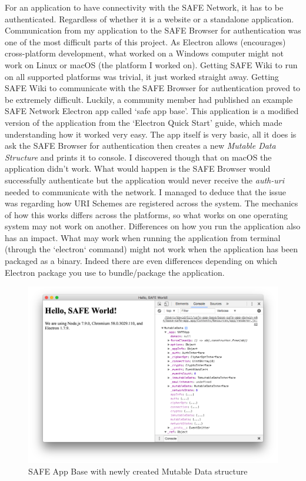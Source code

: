 For an application to have connectivity with the SAFE Network, it has to be authenticated. Regardless of whether it is a website or a standalone application. Communication from my application to the SAFE Browser for authentication was one of the most difficult parts of this project. As Electron allows (encourages) cross-platform development, what worked on a Windows computer might not work on Linux or macOS (the platform I worked on). Getting SAFE Wiki to run on all supported platforms was trivial, it just worked straight away. Getting SAFE Wiki to communicate with the SAFE Browser for authentication proved to be extremely difficult. Luckily, a community member had published an example SAFE Network Electron app called `safe app base'\cite{safe-app-base}. This application is a modified version of the application from the `Electron Quick Start' guide\cite{electron-quick-start}, which made understanding how it worked very easy. The app itself is very basic, all it does is ask the SAFE Browser for authentication then creates a new \textit{Mutable Data Structure} and prints it to console. I discovered though that on macOS the application didn't work. What would happen is the SAFE Browser would successfully authenticate but the application would never receive the \textit{auth-uri} needed to communicate with the network. I managed to deduce that the issue was regarding how URI Schemes are registered across the system. The mechanics of how this works differs across the platforms, so what works on one operating system may not work on another. Differences on how you run the application also has an impact. What may work when running the application from terminal (through the `electron` command) might not work when the application has been packaged as a binary. Indeed there are even differences depending on which Electron package you use to bundle/package the application.

\begin{figure}
	\begin{center}
		\includegraphics{images/safe-app-base}
		\caption{SAFE App Base with newly created Mutable Data structure}
		\label{fig:safe-app-base}
	\end{center}
\end{figure}

